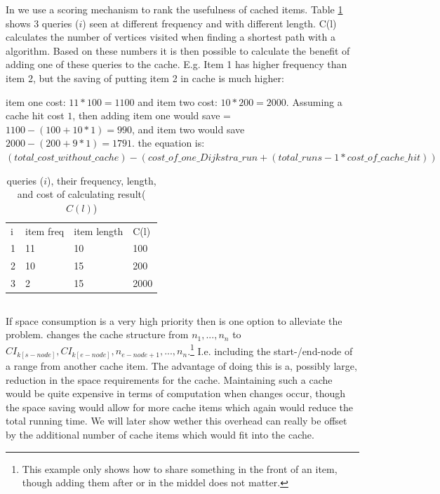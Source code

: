 In \osc we use a scoring mechanism to rank the usefulness of cached items. Table \ref{tab:score} shows 3 queries ($i$) seen at different frequency and with different length. C(l) calculates the number of vertices visited when finding a shortest path with a \spath algorithm. Based on these numbers it is then possible to calculate the benefit of adding one of these \spath queries to the cache. E.g. Item 1 has higher frequency than item 2, but the saving of putting item 2 in cache is much higher:

item one cost: $11*100=1100$ and item two cost: $10*200=2000$. Assuming a cache hit cost $1$, then adding item one would save = $1100-(100+10*1)=990$, and item two would save $2000-(200+9*1)=1791$. the equation is: $(total\_cost\_without\_cache) - (cost\_of\_one\_Dijkstra\_run + (total\_runs-1 * cost\_of\_cache\_hit))$


\begin{table}
\begin{center}
\begin{tabular}{l |l |l |l}
i & item freq & item length & C(l) \\
1 & 11 & 10 & 100 \\
2 & 10 & 15 & 200 \\
3 & 2 & 15 & 2000 \\
\end{tabular}
\end{center}
\caption{\spath queries ($i$), their frequency, length, and cost of calculating result($C(l)$)}
\label{tab:score}
\end{table}





\subsection{\sps}

If space consumption is a very high priority then \sps is one option to alleviate the problem. \sps changes the cache structure from $n_1, ... , n_n$ to $CI_{k\left[s-node\right]},CI_{k\left[e-node\right]}, n_{e-node+1}, ... , n_n$.\footnote{This example only shows how to share something in the front of an item, though adding them after or in the middel does not matter.}
I.e. including the start-/end-node of a range from another cache item. The advantage of doing this is a, possibly large, reduction in the space requirements for the cache. Maintaining such a cache would be quite expensive in terms of computation when changes occur, though the space saving would allow for more cache items which again would reduce the total running time. We will later show wether this overhead can really be offset by the additional number of cache items which would fit into the cache.


